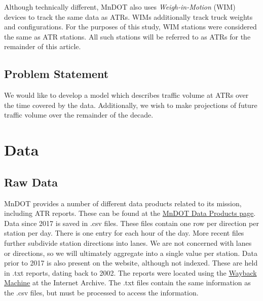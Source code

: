 \documentclass[9pt,twocolumn,twoside, lineno]{jost-new}
\numberwithin{subsection}{section}
\begin{document}
Although technically different, MnDOT also uses \emph{Weigh-in-Motion} (WIM) devices to track the same data as ATRs. WIMs additionally track truck weights and configurations.
For the purposes of this study, WIM stations were considered the same as ATR stations.
All such stations will be referred to as ATRs for the remainder of this article.

\subsection{Problem Statement}\label{subsec:problem-statement}
We would like to develop a model which describes traffic volume at ATRs over the time covered by the data.
Additionally, we wish to make projections of future traffic volume over the remainder of the decade.


\section{Data}\label{sec:data}
\subsection{Raw Data}\label{subsec:raw-data}
MnDOT provides a number of different data products related to its mission, including ATR reports.
These can be found at the \href{https://www.dot.state.mn.us/traffic/data/data-products.html}{MnDOT Data Products page}.
Data since 2017 is saved in .csv files.
These files contain one row per direction per station per day.
There is one entry for each hour of the day.
More recent files further subdivide station directions into lanes.
We are not concerned with lanes or directions, so we will ultimately aggregate into a single value per station.
Data prior to 2017 is also present on the website, although not indexed.
These are held in .txt reports, dating back to 2002.
The reports were located using the \href{https://archive.org/web/}{Wayback Machine} at the Internet Archive.
The .txt files contain the same information as the .csv files, but must be processed to access the information.
\end{document}
